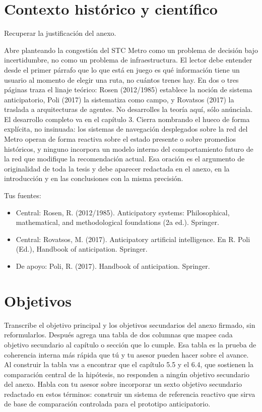 \documentclass[letterpaper,12pt,oneside]{book}
\theoremstyle{definition}
\theoremstyle{plain}
\theoremstyle{remark}
\begin{document}
\section{Contexto histórico y científico}
Recuperar la justificación del anexo.

Abre planteando la congestión del STC Metro como un problema de decisión bajo incertidumbre, no como un problema de infraestructura. El lector debe entender desde el primer párrafo que lo que está en juego es qué información tiene un usuario al momento de elegir una ruta, no cuántos trenes hay.
En dos o tres páginas traza el linaje teórico: Rosen (2012/1985) establece la noción de sistema anticipatorio, Poli (2017) la sistematiza como campo, y Rovatsos (2017) la traslada a arquitecturas de agentes. No desarrolles la teoría aquí, sólo anúnciala. El desarrollo completo va en el capítulo 3.
Cierra nombrando el hueco de forma explícita, no insinuada: los sistemas de navegación desplegados sobre la red del Metro operan de forma reactiva sobre el estado presente o sobre promedios históricos, y ninguno incorpora un modelo interno del comportamiento futuro de la red que modifique la recomendación actual. Esa oración es el argumento de originalidad de toda la tesis y debe aparecer redactada en el anexo, en la introducción y en las conclusiones con la misma precisión.

Tus fuentes:

\begin{itemize}
    \item Central: Rosen, R. (2012/1985). Anticipatory systems: Philosophical, mathematical, and methodological foundations (2a ed.). Springer.
\item Central: Rovatsos, M. (2017). Anticipatory artificial intelligence. En R. Poli (Ed.), Handbook of anticipation. Springer. 
\item De apoyo: Poli, R. (2017). Handbook of anticipation. Springer. 
\end{itemize}

\section{Objetivos}
Transcribe el objetivo principal y los objetivos secundarios del anexo firmado, sin reformularlos. Después agrega una tabla de dos columnas que mapee cada objetivo secundario al capítulo o sección que lo cumple. Esa tabla es la prueba de coherencia interna más rápida que tú y tu asesor pueden hacer sobre el avance.
Al construir la tabla vas a encontrar que el capítulo 5.5 y el 6.4, que sostienen la comparación central de la hipótesis, no responden a ningún objetivo secundario del anexo. Habla con tu asesor sobre incorporar un sexto objetivo secundario redactado en estos términos: construir un sistema de referencia reactivo que sirva de base de comparación controlada para el prototipo anticipatorio.
\end{document}
